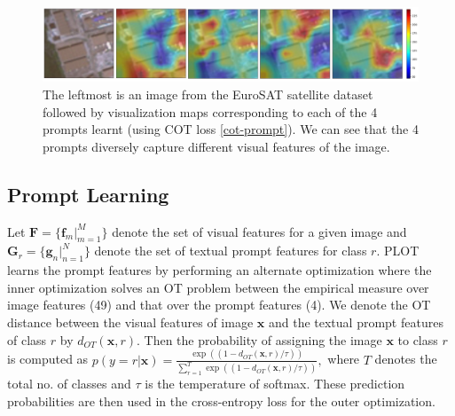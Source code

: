 \begin{figure}[ht!]
    \centering
    \includegraphics[width=\columnwidth]{chapter-3/images/prompt-prop.pdf}
    \caption{The leftmost is an image from the EuroSAT satellite dataset followed by visualization maps corresponding to each of the 4 prompts learnt (using COT loss \ref{cot-prompt}). We can see that the 4 prompts diversely capture different visual features of the image.}
    \label{fig:prompt-prop}
\end{figure}
\subsection{Prompt Learning}
Let $\mathbf{F}=\{\mathbf{f}_m|_{m=1}^M\}$ denote the set of visual features for a given image and $\mathbf{G}_r=\{\mathbf{g}_n|_{n=1}^N\}$ denote the set of textual prompt features for class $r$. PLOT \citep{chen2023plot} learns the prompt features by performing an alternate optimization where the inner optimization solves an OT problem between the empirical measure over image features (49) and that over the prompt features (4). We denote the OT distance between the visual features of image $\mathbf{x}$ and the textual prompt features of class $r$ by $d_{OT}(\mathbf{x}, r)$. Then the probability of assigning the image $\mathbf{x}$ to class $r$ is computed as
$
    p(y=r|\mathbf{x}) = \frac{\exp{\left((1-d_{OT}(\mathbf{x}, r)/\tau)\right)}}{\sum_{r=1}^T\exp{\left((1-d_{OT}(\mathbf{x}, r)/\tau)\right)}},
$ where $T$ denotes the total no. of classes and $\tau$ is the temperature of softmax. These prediction probabilities are then used in the cross-entropy loss for the outer optimization.

